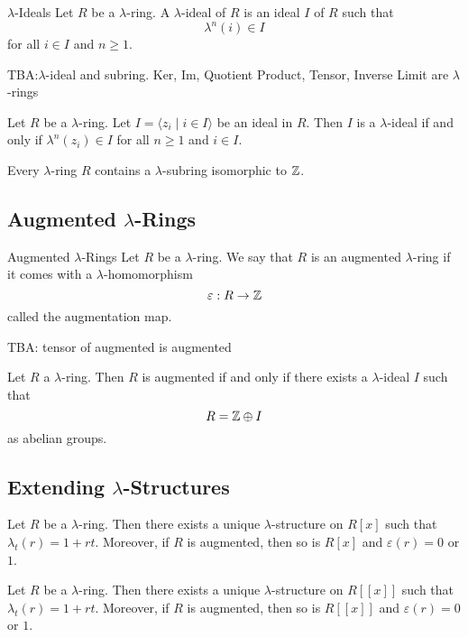 \documentclass[a4paper]{article}
\begin{document}
\begin{defn}{$\lambda$-Ideals}{} Let $R$ be a $\lambda$-ring. A $\lambda$-ideal of $R$ is an ideal $I$ of $R$ such that $$\lambda^n(i)\in I$$ for all $i\in I$ and $n\geq 1$. 
\end{defn}

TBA:$\lambda$-ideal and subring. Ker, Im, Quotient Product, Tensor, Inverse Limit are $\lambda$-rings

\begin{prp}{}{} Let $R$ be a $\lambda$-ring. Let $I=\langle z_i\;|\;i\in I\rangle$ be an ideal in $R$. Then $I$ is a $\lambda$-ideal if and only if $\lambda^n(z_i)\in I$ for all $n\geq 1$ and $i\in I$. 
\end{prp}

\begin{prp}{}{} Every $\lambda$-ring $R$ contains a $\lambda$-subring isomorphic to $\mathbb{Z}$. 
\end{prp}

\subsection{Augmented $\lambda$-Rings}
\begin{defn}{Augmented $\lambda$-Rings}{} Let $R$ be a $\lambda$-ring. We say that $R$ is an augmented $\lambda$-ring if it comes with a $\lambda$-homomorphism $$\varepsilon:R\to\mathbb{Z}$$ called the augmentation map. 
\end{defn}

TBA: tensor of augmented is augmented

\begin{prp}{}{} Let $R$ a $\lambda$-ring. Then $R$ is augmented if and only if there exists a $\lambda$-ideal $I$ such that $$R=\mathbb{Z}\oplus I$$ as abelian groups. 
\end{prp}

\subsection{Extending $\lambda$-Structures}
\begin{prp}{}{} Let $R$ be a $\lambda$-ring. Then there exists a unique $\lambda$-structure on $R[x]$ such that $\lambda_t(r)=1+rt$. Moreover, if $R$ is augmented, then so is $R[x]$ and $\varepsilon(r)=0$ or $1$. 
\end{prp}

\begin{prp}{}{} Let $R$ be a $\lambda$-ring. Then there exists a unique $\lambda$-structure on $R[[x]]$ such that $\lambda_t(r)=1+rt$. Moreover, if $R$ is augmented, then so is $R[[x]]$ and $\varepsilon(r)=0$ or $1$. 
\end{prp}
\end{document}
